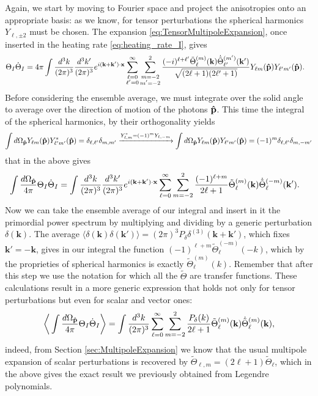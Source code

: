 Again, we start by moving to Fourier space and project the anisotropies onto an appropriate basis: as we know, for tensor perturbations the spherical harmonics $Y_{\ell,\pm2}$ must be chosen. The expansion \eqref{eq:TensorMultipoleExpansion}, once inserted in the heating rate \eqref{eq:heating_rate_I}, gives
\begin{align*}
    \Theta_I\dot \Theta_I&=4\pi\int\frac{d^3k}{(2\pi)^3}\frac{d^3k'}{(2\pi)^3}e^{i(\mathbf{k}+\mathbf{k}')\cdot\mathbf{x}}\sum_{\substack{\ell=0\\\ell'=0}}^{\infty}\sum_{\substack{m=-2\\m'=-2}}^{2}\frac{(-i)^{\ell+\ell'}\tilde\Theta_\ell^{(m)}(\mathbf{k})\dot{\tilde\Theta}_{\ell'}^{(m')}(\mathbf{k}')}{\sqrt{(2\ell+1)(2\ell'+1)}}Y_{\ell m}(\mathbf{\hat{p}})Y_{\ell' m'}(\mathbf{\hat{p}}).
\end{align*}
Before considering the ensemble average, we must integrate over the solid angle to average over the direction of motion of the photons $\mathbf{\hat{p}}$. This time the integral of the spherical harmonics, by their orthogonality yields
$$\int d\Omega_{\mathbf{\hat{p}}} Y_{\ell m}(\mathbf{\hat{p}})Y^*_{\ell' m'}(\mathbf{\hat{p}})=\delta_{\ell, \ell'}\delta_{m,m'} \xrightarrow{Y^*_{\ell, m}=(-1)^mY_{\ell, -m}} \int d\Omega_{\mathbf{\hat{p}}} Y_{\ell m}(\mathbf{\hat{p}})Y_{\ell' m'}(\mathbf{\hat{p}})=(-1)^m\delta_{\ell, \ell'}\delta_{m,-m'}$$ 
that in the above gives
\begin{align*}
    \int\frac{d\Omega_{\mathbf{\hat{p}}}}{4\pi}\Theta_I\dot \Theta_I&=\int\frac{d^3k}{(2\pi)^3}\frac{d^3k'}{(2\pi)^3}e^{i(\mathbf{k}+\mathbf{k}')\cdot\mathbf{x}}\sum_{\ell=0}^{\infty}\sum_{m=-2}^{2}\frac{(-1)^{\ell+m}}{2\ell+1}\tilde\Theta_\ell^{(m)}(\mathbf{k})\dot{\tilde\Theta}_{\ell}^{(-m)}(\mathbf{k}').
\end{align*}
Now we can take the ensemble average of our integral and insert in it the primordial power spectrum by multiplying and dividing by a generic perturbation $\delta(\mathbf{k})$. The average $\langle\delta(\mathbf{k})\delta(\mathbf{k}')\rangle=(2\pi)^3{P}_\delta\delta^{(3)}(\mathbf{k}+\mathbf{k}')$, which fixes $\mathbf{k}'=-\mathbf{k}$, gives in our integral the function $(-1)^{\ell+m}\tilde\Theta_\ell^{(-m)}(-k)$, which by the proprieties of spherical harmonics is exactly $\tilde \Theta_\ell^{(m)}(k)$.  Remember that after this step we use the notation for which all the $\tilde\Theta$ are transfer functions. These calculations result in a more generic expression that holds not only for tensor perturbations but even for scalar and vector ones:
\begin{equation}
    \bigg\langle\int\frac{d\Omega_{\mathbf{\hat{p}}}}{4\pi}\Theta_I\dot \Theta_I\bigg\rangle=\int\frac{d^3k}{(2\pi)^3}\sum_{\ell=0}^{\infty}\sum_{m=-2}^{2}\frac{{P}_\delta (k)}{2\ell+1}\tilde\Theta_\ell^{(m)}(\mathbf{k})\dot{\tilde\Theta}_{\ell}^{(m)}(\mathbf{k}),\label{eq:I_heating_rate_general}
\end{equation} 
indeed, from Section \ref{sec:MultipoleExpansion} we know that the usual multipole expansion of scalar perturbations is recovered by $\tilde\Theta_{\ell,m}=(2\ell+1)\tilde\Theta_\ell$, which in the above gives the exact result we previously obtained from Legendre polynomials.

